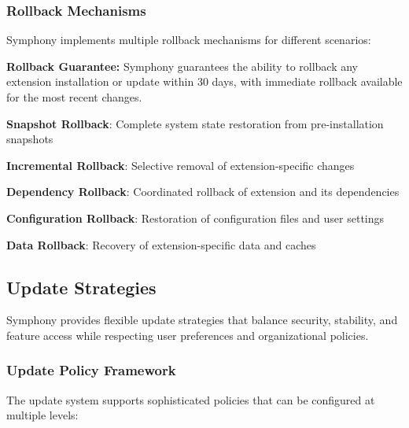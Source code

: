 \subsubsection{Rollback Mechanisms}
\label{subsubsec:rollback-mechanisms}

Symphony implements multiple rollback mechanisms for different scenarios:

\begin{alertbox}
\textbf{Rollback Guarantee:} Symphony guarantees the ability to rollback any extension installation or update within 30 days, with immediate rollback available for the most recent changes.
\end{alertbox}

\begin{expandedlist}
\item \textbf{Snapshot Rollback}: Complete system state restoration from pre-installation snapshots
\item \textbf{Incremental Rollback}: Selective removal of extension-specific changes
\item \textbf{Dependency Rollback}: Coordinated rollback of extension and its dependencies
\item \textbf{Configuration Rollback}: Restoration of configuration files and user settings
\item \textbf{Data Rollback}: Recovery of extension-specific data and caches
\end{expandedlist}

\subsection{Update Strategies}
\label{subsec:update-strategies}

Symphony provides flexible update strategies that balance security, stability, and feature access while respecting user preferences and organizational policies.

\subsubsection{Update Policy Framework}
\label{subsubsec:update-policy-framework}

The update system supports sophisticated policies that can be configured at multiple levels:

